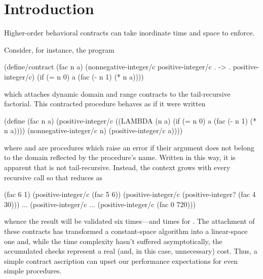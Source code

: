 \documentclass{sigplanconf}
\begin{document}
\section{Introduction}

Higher-order behavioral contracts can take inordinate time and space to enforce.



Consider, for instance, the program
\begin{schemedisplay}
(define/contract (fac n a)
  (nonnegative-integer/c positive-integer/c . -> . positive-integer/c)
  (if (= n 0)
      a
      (fac (- n 1) (* n a))))
\end{schemedisplay}
which attaches dynamic domain and range contracts to the tail-recursive factorial.
This contracted procedure behaves as if it were written
\begin{schemedisplay}
(define (fac n a)
  (positive-integer/c
   ((LAMBDA (n a)
      (if (= n 0)
          a
          (fac (- n 1) (* n a))))
    (nonnegative-integer/c n)
    (positive-integer/c a))))
\end{schemedisplay}
where  and  are procedures which raise an error if their argument does not belong to the domain reflected by the procedure's name.
Written in this way, it is apparent that  is not tail-recursive.
Instead, the context grows with every recursive call so that  reduces as
\begin{schemedisplay}
(fac 6 1)
(positive-integer/c (fac 5 6))
(positive-integer/c (positive-integer? (fac 4 30)))
...
(positive-integer/c ... (positive-integer/c (fac 0 720)))
\end{schemedisplay}
whence the result will be validated six times---and  times for .
The attachment of these contracts has transformed a constant-space algorithm into a linear-space one and, while the time complexity hasn't suffered asymptotically, the accumulated checks represent a real (and, in this case, unnecessary) cost.
Thus, a simple contract ascription can upset our performance expectations for even simple procedures.
\end{document}
